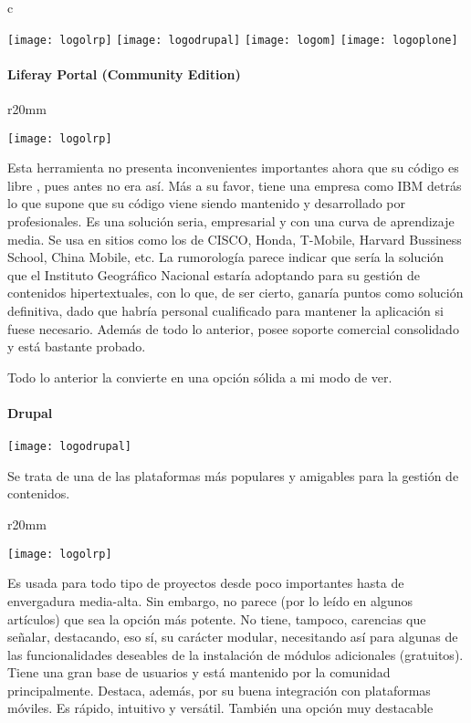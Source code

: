 \begin{wrapfigure}{c}{\linewidth}
\begin{center}
\texttt{[image: logolrp]}
\texttt{[image: logodrupal]}
\texttt{[image: logom]}
\texttt{[image: logoplone]}
\end{center}
\end{wrapfigure}

\paragraph{Liferay Portal (Community Edition)}
\begin{wrapfigure}{r}{20mm}
\begin{center}
\texttt{[image: logolrp]}
\end{center}
\end{wrapfigure}
\par Esta herramienta no presenta inconvenientes importantes ahora que su código es libre \cite{references:liferaylicense}, pues antes no era así. Más a su favor, tiene una empresa como IBM detrás lo que supone que su código viene siendo mantenido y desarrollado por profesionales. Es una solución seria, empresarial y con una curva de aprendizaje media. Se usa en sitios como los de CISCO, Honda, T-Mobile, Harvard Bussiness School, China Mobile, etc.
La rumorología parece indicar que sería la solución que el Instituto Geográfico Nacional estaría adoptando para su gestión de contenidos hipertextuales, con lo que, de ser cierto, ganaría puntos como solución definitiva, dado que habría personal cualificado para mantener la aplicación si fuese necesario.
Además de todo lo anterior, posee soporte comercial consolidado y está bastante probado.
\par Todo lo anterior la convierte en una opción sólida a mi modo de ver.

\paragraph{Drupal}
\texttt{[image: logodrupal]}
\par Se trata de una de las plataformas más populares y amigables para la gestión de contenidos. 
\begin{wrapfigure}{r}{20mm}
\begin{center}
\texttt{[image: logolrp]}
\end{center}
\end{wrapfigure}
Es usada para todo tipo de proyectos desde poco importantes hasta de envergadura media-alta. Sin embargo, no parece (por lo leído en algunos artículos) que sea la opción más potente.
No tiene, tampoco, carencias que señalar, destacando, eso sí, su carácter modular, necesitando así para algunas de las funcionalidades deseables de la instalación de módulos adicionales (gratuitos). Tiene una gran base de usuarios y está mantenido por la comunidad principalmente. Destaca, además, por su buena integración con plataformas móviles.
Es rápido, intuitivo y versátil. También una opción muy destacable

